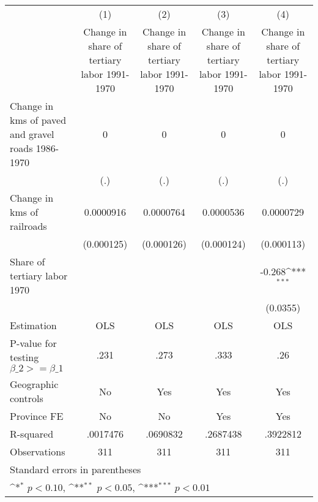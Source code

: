 {
\def\sym#1{\ifmmode^{#1}\else\(^{#1}\)\fi}
\begin{tabular}{l*{4}{c}}
\hline\hline
                    &\multicolumn{1}{c}{(1)}&\multicolumn{1}{c}{(2)}&\multicolumn{1}{c}{(3)}&\multicolumn{1}{c}{(4)}\\
                    &\multicolumn{1}{c}{Change in share of tertiary labor 1991-1970}&\multicolumn{1}{c}{Change in share of tertiary labor 1991-1970}&\multicolumn{1}{c}{Change in share of tertiary labor 1991-1970}&\multicolumn{1}{c}{Change in share of tertiary labor 1991-1970}\\
\hline
Change in kms of paved and gravel roads 1986-1970&           0         &           0         &           0         &           0         \\
                    &         (.)         &         (.)         &         (.)         &         (.)         \\
[1em]
Change in kms of railroads&   0.0000916         &   0.0000764         &   0.0000536         &   0.0000729         \\
                    &  (0.000125)         &  (0.000126)         &  (0.000124)         &  (0.000113)         \\
[1em]
Share of tertiary labor 1970&                     &                     &                     &      -0.268\sym{***}\\
                    &                     &                     &                     &    (0.0355)         \\
\hline
Estimation          &         OLS         &         OLS         &         OLS         &         OLS         \\
P-value for testing $\beta\_2 >= \beta\_1$&        .231         &        .273         &        .333         &         .26         \\
Geographic controls &          No         &         Yes         &         Yes         &         Yes         \\
Province FE         &          No         &          No         &         Yes         &         Yes         \\
R-squared           &    .0017476         &    .0690832         &    .2687438         &    .3922812         \\
Observations        &         311         &         311         &         311         &         311         \\
\hline\hline
\multicolumn{5}{l}{\footnotesize Standard errors in parentheses}\\
\multicolumn{5}{l}{\footnotesize \sym{*} \(p<0.10\), \sym{**} \(p<0.05\), \sym{***} \(p<0.01\)}\\
\end{tabular}
}
